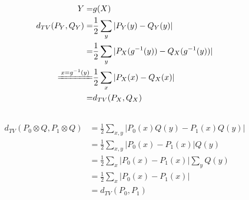 \documentclass{article}
\numberwithin{equation}{section}
\begin{document}
\subsection{}
\begin{align}
Y=&g(X)\\
d_{TV}(P_{Y}, Q_{Y}) = &\frac{1}{2}\sum_{y} \vert P_{Y}(y) - Q_{Y}(y) \vert\\
= &\frac{1}{2}\sum_{y} \vert P_{X}(g^{-1}(y)) - Q_{X}(g^{-1}(y)) \vert\\
\xlongequal{x=g^{-1}(y)}& \frac{1}{2}\sum_{x} \vert P_{X}(x) - Q_{X}(x) \vert\\
=& d_{TV}(P_{X}, Q_{X})
\end{align}
\subsection{}
\begin{align}
d_{TV}(P_0\otimes Q, P_1\otimes Q) &= \frac{1}{2} \sum_{x, y} \vert P_0(x)Q(y) - P_1(x)Q(y) \vert\\
&= \frac{1}{2} \sum_{x, y} \vert P_0(x) - P_1(x) \vert Q(y)\\
&= \frac{1}{2} \sum_{x} \vert P_0(x) - P_1(x) \vert \sum_{y} Q(y)\\
&= \frac{1}{2} \sum_{x} \vert P_0(x) - P_1(x) \vert\\
&= d_{TV}(P_0, P_1)
\end{align}
\end{document}
